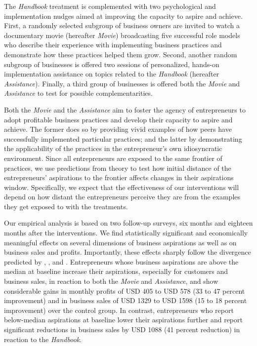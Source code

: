 \documentclass[11.5pt]{article}
\begin{document}

The \emph{Handbook} treatment is complemented with two psychological and implementation nudges aimed at improving the capacity to aspire and achieve. First, a randomly selected subgroup of business owners are invited to watch a documentary movie (hereafter \emph{Movie}) broadcasting five successful role models who describe their experience with implementing business practices and demonstrate how these practices helped them grow.
Second, another random subgroup of businesses is offered two sessions of personalized, hands-on implementation assistance on topics related to the \emph{Handbook} (hereafter \emph{Assistance}). Finally, a third group of businesses is offered both the \emph{Movie} and \emph{Assistance} to test for possible complementarities.

Both the \emph{Movie} and the \emph{Assistance} aim to foster the agency of entrepreneurs to adopt profitable business practices and develop their capacity to aspire and achieve. The former does so by providing vivid examples of how peers have successfully implemented particular practices; and the latter by demonstrating the applicability of the practices in the entrepreneur's own idiosyncratic environment. Since all entrepreneurs are exposed to the same frontier of practices, we use predictions from theory to test how initial distance of the entrepreneurs' aspirations to the frontier affects changes in their aspirations window. Specifically, we expect that the effectiveness of our interventions will depend on how distant the entrepreneurs perceive they are from the examples they get exposed to with the treatments.

Our empirical analysis is based on two follow-up surveys, six months and eighteen months after the interventions. We find statistically significant and economically meaningful effects on several dimensions of business aspirations as well as on business sales and profits. Importantly, these effects sharply follow the divergence predicted by \citet{Ray2006}, \citet{Genicot2017}, and \citet{Dalton2016}. Entrepreneurs whose business aspirations are above the median at baseline increase their aspirations, especially for customers and business sales, in reaction to both the \emph{Movie} and \emph{Assistance}, and show considerable gains in monthly profits of USD 405 to USD 578 (33 to 47 percent improvement) and in business sales of USD 1329 to USD 1598 (15 to 18 percent improvement) over the control group. In contrast, entrepreneurs who report below-median aspirations at baseline lower their aspirations further and report significant reductions in business sales by USD 1088 (41 percent reduction) in reaction to the \emph{Handbook}.
\end{document}
